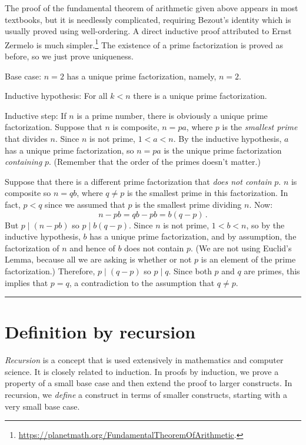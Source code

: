 \documentclass[11pt,a4paper]{report}
\newcommand*{\qed}{\hfill\rule{1ex}{1.5ex}}
\begin{document}
The proof of the fundamental theorem of arithmetic given above appears in most textbooks, but it is needlessly complicated, requiring Bezout's identity which is usually proved using well-ordering. A direct inductive proof attributed to Ernst Zermelo is much simpler.\footnote{\url{https://planetmath.org/FundamentalTheoremOfArithmetic}.} The existence of a prime factorization is proved as before, so we just prove uniqueness.

Base case: $n=2$ has a unique prime factorization, namely, $n=2$. 

Inductive hypothesis: For all $k<n$ there is a unique prime factorization.

Inductive step: If $n$ is a prime number, there is obviously a unique prime factorization. Suppose that $n$ is composite, $n=pa$, where $p$ is the \emph{smallest prime} that divides $n$. Since $n$ is not prime, $1<a<n$. By the inductive hypothesis, $a$ has a unique prime factorization, so $n=pa$ is the unique prime factorization \emph{containing} $p$. (Remember that the order of the primes doesn't matter.)

Suppose that there is a different prime factorization that \emph{does not contain} $p$. $n$ is composite so $n=qb$, where $q\neq p$ is the smallest prime in this factorization. In fact, $p<q$ since we assumed that $p$ is the smallest prime dividing $n$. Now:
\[
n - pb = qb - pb = b(q-p)\,.
\]
But $p\mid (n-pb)$ so $p\mid b(q-p)$.  Since $n$ is not prime, $1<b<n$, so by the inductive hypothesis, $b$ has a unique prime factorization, and by assumption, the factorization of $n$ and hence of $b$ does not contain $p$. (We are not using Euclid's Lemma, because all we are asking is whether or not $p$ is an element of the prime factorization.) Therefore, $p\mid(q-p)$ so $p\mid q$. Since both $p$ and $q$ are primes, this implies that $p=q$, a contradiction to the assumption that $q\neq p$.\qed


\section{Definition by recursion}

\emph{Recursion} is a concept that is used extensively in mathematics and computer science. It is closely related to induction. In proofs by induction, we prove a property of a small base case and then extend the proof to larger constructs. In recursion, we \emph{define} a construct in terms of smaller constructs, starting with a very small base case.
\end{document}
